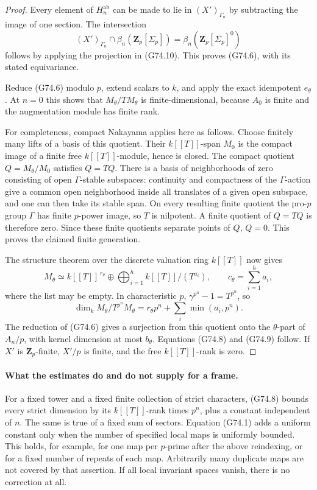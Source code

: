 \begin{proof}
Every element of \(H_n^{\mathrm{ab}}\) can be made to lie in
\((X')_{\Gamma_n}\) by subtracting the image of one section.
The intersection
\[
 (X')_{\Gamma_n}\cap\beta_n(\mathbf Z_p[\Sigma_p])
                 =\beta_n(\mathbf Z_p[\Sigma_p]^0)
\]
follows by applying the projection in (G74.10).
This proves (G74.6), with its stated equivariance.

Reduce (G74.6) modulo \(p\), extend scalars to \(k\), and apply
the exact idempotent \(e_\theta\).
At \(n=0\) this shows that \(M_\theta/TM_\theta\) is finite-dimensional,
because \(A_0\) is finite and the augmentation module has finite rank.

For completeness, compact Nakayama applies here as follows.
Choose finitely many lifts of a basis of this quotient.
Their \(k[[T]]\)-span \(M_0\) is the compact image of a finite free
\(k[[T]]\)-module, hence is closed.
The compact quotient \(Q=M_\theta/M_0\) satisfies \(Q=TQ\).
There is a basis of neighborhoods of zero consisting of open
\(\Gamma\)-stable subspaces: continuity and compactness of the
\(\Gamma\)-action give a common open neighborhood inside all
translates of a given open subspace, and one can then take its
stable span.
On every resulting finite quotient the pro-\(p\) group \(\Gamma\)
has finite \(p\)-power image, so \(T\) is nilpotent.
A finite quotient of \(Q=TQ\) is therefore zero.
Since these finite quotients separate points of \(Q\), \(Q=0\).
This proves the claimed finite generation.

The structure theorem over the discrete valuation ring \(k[[T]]\)
now gives
\[
 M_\theta\simeq k[[T]]^{\,r_\theta}
              \oplus\bigoplus_{i=1}^{h}k[[T]]/(T^{a_i}),
              \qquad c_\theta=\sum_{i=1}^{h}a_i ,
                                                               \tag{G74.12}
\]
where the list may be empty.
In characteristic \(p\), \(\gamma^{p^n}-1=T^{p^n}\), so
\[
 \dim_k M_\theta/T^{p^n}M_\theta
       =r_\theta p^n+\sum_i\min(a_i,p^n).
                                                               \tag{G74.13}
\]
The reduction of (G74.6) gives a surjection from this quotient
onto the \(\theta\)-part of \(A_n/p\), with kernel dimension at
most \(b_\theta\).  Equations (G74.8) and (G74.9) follow.
If \(X'\) is \(\mathbf Z_p\)-finite, \(X'/p\) is finite, and the
free \(k[[T]]\)-rank is zero.
\end{proof}

\paragraph{What the estimates do and do not supply for a frame.}
For a fixed tower and a fixed finite collection of strict characters,
(G74.8) bounds every strict dimension by its \(k[[T]]\)-rank times
\(p^n\), plus a constant independent of \(n\).
The same is true of a fixed sum of sectors.
Equation (G74.1) adds a uniform constant only when the number of
specified local maps is uniformly bounded.  This holds, for example,
for one map per \(p\)-prime after the above reindexing, or for a fixed
number of repeats of each map.  Arbitrarily many duplicate maps are
not covered by that assertion.  If all local invariant spaces vanish,
there is no correction at all.


